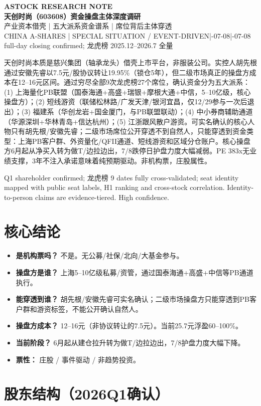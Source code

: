 \documentclass[a4paper,11pt,fontset=none]{ctexart}
\newcommand{\reporttitle}{天创时尚（603608）资金操盘主体深度调研}
\newcommand{\reportsubtitle}{产业资本借壳 | 五大派系资金谱系 | 席位背后主体穿透}
\newcommand{\reportkicker}{ASTOCK RESEARCH NOTE}
\newcommand{\reportscope}{CHINA A-SHARES | SPECIAL SITUATION / EVENT-DRIVEN}
\newcommand{\reportdate}{2026-07-08}
\newcommand{\reportdatacutoff}{2026-07-08 full-day closing confirmed; 龙虎榜 2025.12--2026.7 全量}
\newcommand{\reporthouseview}{%
天创时尚本质是慈兴集团（轴承龙头）借壳上市平台，非服装公司。实控人胡先根通过安徽先睿以7.5元/股协议转让19.95\%（锁仓5年），但二级市场真正的操盘方成本在12--16元区间。通过穷尽全部9次龙虎榜27个席位，确认资金分为五大派系：(1) 上海量化PB联盟（国泰海通+高盛+瑞银+摩根大通+中信，5--10亿级，核心操盘方）；(2) 短线游资（联储松林路/广发天津/银河宜昌，仅12/29参与一次后退出）；(3) 福建系（华创龙岩+国金厦门，与PB联盟联动）；(4) 中小券商辅助通道（华源深圳+华林青岛+信达杭州）；(5) 江浙跟风散户游资。可实名确认的核心人物只有胡先根/安徽先睿；二级市场席位公开穿透不到自然人，只能穿透到资金类型：上海PB客户群、外资量化/QFII通道、短线游资和区域分仓账户。核心操盘方6月起从净买入转为做T/边拉边出，7/8跌停日护盘力度大幅减弱。PE 383x无业绩支撑，3年不注入承诺意味着纯预期驱动。非机构票，庄股属性。%
}
\newcommand{\reportquality}{Q1 shareholder confirmed; 龙虎榜 9 dates fully cross-validated; seat identity mapped with public seat labels, H1 ranking and cross-stock correlation. Identity-to-person claims are evidence-tiered. High confidence.}
\begin{document}
\begin{center}
{\sffamily\small\bfseries\color{steelgrey} \reportkicker}\\[3pt]
{\LARGE\bfseries\color{navy} \reporttitle}\\[5pt]
{\large\color{steelgrey} \reportsubtitle}\\[4pt]
{\small\color{mutedgrey} \reportscope \quad|\quad \reportdate \quad|\quad \reportdatacutoff}
\end{center}
\vspace{0.7em}

\begin{dashboardbox}
\begin{houseviewbox}
\reporthouseview
\end{houseviewbox}
\begin{sourcequalitybox}
\reportquality
\end{sourcequalitybox}
\end{dashboardbox}

\section{核心结论}

\begin{riskbox}[定性判断]
\begin{itemize}
  \item \textbf{是机构票吗？} 不是。无公募/社保/北向/大基金参与。
  \item \textbf{操盘方是谁？} 上海5--10亿级私募/资管，通过国泰海通+高盛+中信等PB通道执行。
  \item \textbf{能穿透到谁？} 胡先根/安徽先睿可实名确认；二级市场操盘方只能穿透到PB客户群和游资标签，不能公开确认自然人。
  \item \textbf{操盘方成本？} 12--16元（非协议转让的7.5元）。当前25.7元浮盈60--100\%。
  \item \textbf{当前阶段？} 6月起从建仓拉升转为做T/边拉边出，7/8护盘力度大幅下降。
  \item \textbf{票性：} 庄股 / 事件驱动 / 非趋势投资。
\end{itemize}
\end{riskbox}

\section{股东结构（2026Q1确认）}
\end{document}
